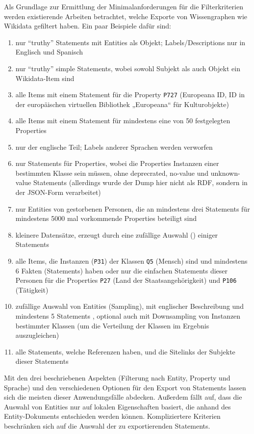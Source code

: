 Als Grundlage zur Ermittlung der Minimalanforderungen für die Filterkriterien werden existierende Arbeiten betrachtet, welche Exporte von Wissengraphen wie Wikidata gefiltert haben.
Ein paar Beispiele dafür sind:
\begin{enumerate}[label=\arabic*)]
  \item nur "`truthy"' Statements mit Entities als Objekt; Labels/Descriptions nur in Englisch und Spanisch \cite{usage-grafa}
  \item nur "`truthy"' simple Statements, wobei sowohl Subjekt als auch Objekt ein Wikidata-Item sind \cite{usage-wembedder}
  \item alle Items mit einem Statement für die Property \verb|P727| (Europeana ID, ID in der europäischen virtuellen Bibliothek „Europeana“ für Kulturobjekte) \cite{usage-europeana}
  \item alle Items mit einem Statement für mindestens eine von 50 festgelegten Properties \cite{usage-narratives} 
  \item nur der englische Teil; Labels anderer Sprachen werden verworfen \cite{usage-web-tables} 
  \item nur Statements für Properties, wobei die Properties Instanzen einer bestimmten Klasse sein müssen, ohne deprecrated, no-value und unknown-value Statements \cite{usage-implicational-knowledge} (allerdings wurde der Dump hier nicht als RDF, sondern in der JSON-Form verarbeitet)
  \item nur Entities von gestorbenen Personen, die an mindestens drei Statements für mindestens 5000 mal vorkommende Properties beteiligt sind \cite{usage-learning-structured-embeddings}
  \item kleinere Datensätze, erzeugt durch eine zufällige Auswahl () einiger Statements \cite{usage-sparql-benchmark}
  \item alle Items, die Instanzen (\verb|P31|) der Klassen \verb|Q5| (Mensch) sind und mindestens 6 Fakten (Statements) haben\cite{usage-one-sentence} oder nur die einfachen Statements dieser Personen für die Properties \verb|P27| (Land der Staatsangehörigkeit) und \verb|P106| (Tätigkeit) \cite{usage-person-networks}
  \item zufällige Auswahl von Entities (Sampling), mit englischer Beschreibung und mindestens 5 Statements \cite{usage-generate-entity-type-desc}, optional auch mit Downsampling von Instanzen bestimmter Klassen (um die Verteilung der Klassen im Ergebnis auszugleichen) \cite{usage-synthesize-entity-desc}
  \item alle Statements, welche Referenzen haben, und die Sitelinks der Subjekte dieser Statements \cite{wd-wk-common-references}
\end{enumerate}
Mit den drei beschriebenen Aspekten (Filterung nach Entity, Property und Sprache) und den verschiedenen Optionen für den Export von Statements lassen sich die meisten dieser Anwendungsfälle abdecken.
Außerdem fällt auf, dass die Auswahl von Entities nur auf lokalen Eigenschaften basiert, die anhand des Entity-Dokuments entschieden werden können. 
Kompliziertere Kriterien beschränken sich auf die Auswahl der zu exportierenden Statements.

